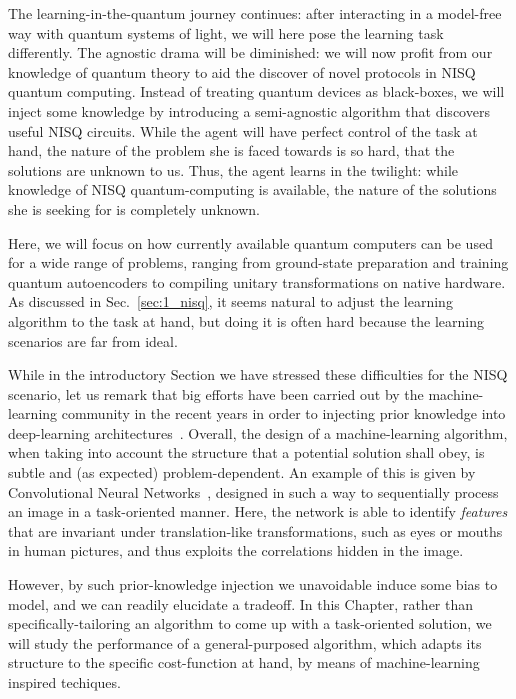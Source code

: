 The learning-in-the-quantum journey continues: after interacting in a model-free way with quantum systems of light, we will here pose the learning task differently. The agnostic drama will be diminished: we will now profit from our knowledge of quantum theory to aid the discover of novel protocols in NISQ quantum computing. Instead of treating quantum devices as black-boxes, we will inject some knowledge by introducing a semi-agnostic algorithm that discovers useful NISQ circuits. While the agent will have perfect control of the task at hand, the nature of the problem she is faced towards is so hard, that the solutions are unknown to us. Thus, the agent learns in the twilight: while knowledge of NISQ quantum-computing is available, the nature of the solutions she is seeking for is completely unknown.

Here, we will focus on how currently available quantum computers can be used for a wide range of problems, ranging from ground-state preparation and training quantum autoencoders to compiling unitary transformations on native hardware. As discussed in Sec.~\ref{sec:1_nisq}, it seems natural to adjust the learning algorithm to the task at hand, but doing it is often hard because the learning scenarios are far from ideal.

While in the introductory Section we have stressed these difficulties for the NISQ scenario, let us remark that big efforts have been carried out by the machine-learning community in the recent years in order to injecting prior knowledge into deep-learning architectures~\cite{9363511, ShlezingerNir2020VADL}. Overall, the design of a machine-learning algorithm, when taking into account the structure that a potential solution shall obey, is subtle and (as expected) problem-dependent. An example of this is given by Convolutional Neural Networks~\cite{CNN,CNN1,CNN2}, designed in such a way to sequentially process an image in a task-oriented manner. Here, the network is able to identify \textit{features} that are invariant under translation-like transformations, such as eyes or mouths in human pictures, and thus exploits the correlations hidden in the image. %

However, by such prior-knowledge injection we unavoidable induce some bias to model, and we can readily elucidate a tradeoff. In this Chapter, rather than specifically-tailoring an algorithm to come up with a task-oriented solution, we will study the performance of a general-purposed algorithm, which adapts its structure to the specific cost-function at hand, by means of machine-learning inspired techiques.

